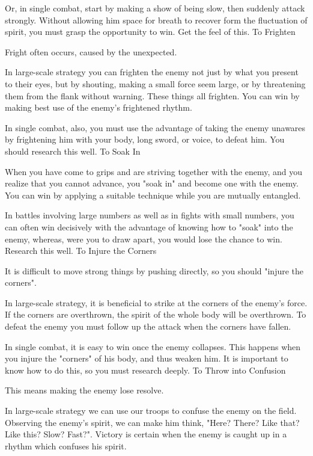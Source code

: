 Or, in single combat, start by making a show of being slow, then suddenly attack strongly. Without allowing him space for breath to recover form the fluctuation of spirit, you must grasp the opportunity to win. Get the feel of this.
To Frighten

Fright often occurs, caused by the unexpected.

In large-scale strategy you can frighten the enemy not just by what you present to their eyes, but by shouting, making a small force seem large, or by threatening them from the flank without warning. These things all frighten. You can win by making best use of the enemy's frightened rhythm.

In single combat, also, you must use the advantage of taking the enemy unawares by frightening him with your body, long sword, or voice, to defeat him. You should research this well.
To Soak In

When you have come to grips and are striving together with the enemy, and you realize that you cannot advance, you "soak in" and become one with the enemy. You can win by applying a suitable technique while you are mutually entangled.

In battles involving large numbers as well as in fights with small numbers, you can often win decisively with the advantage of knowing how to "soak" into the enemy, whereas, were you to draw apart, you would lose the chance to win. Research this well.
To Injure the Corners

It is difficult to move strong things by pushing directly, so you should "injure the corners".

In large-scale strategy, it is beneficial to strike at the corners of the enemy's force. If the corners are overthrown, the spirit of the whole body will be overthrown. To defeat the enemy you must follow up the attack when the corners have fallen.

In single combat, it is easy to win once the enemy collapses. This happens when you injure the "corners" of his body, and thus weaken him. It is important to know how to do this, so you must research deeply.
To Throw into Confusion

This means making the enemy lose resolve.

In large-scale strategy we can use our troops to confuse the enemy on the field. Observing the enemy's spirit, we can make him think, "Here? There? Like that? Like this? Slow? Fast?". Victory is certain when the enemy is caught up in a rhythm which confuses his spirit.

